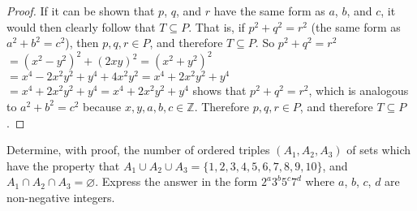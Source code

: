 \documentclass[12pt]{article}
\newenvironment{problem}[2][Problem]{\begin{trivlist}
\item[\hskip \labelsep {\bfseries #1}\hskip \labelsep {\bfseries #2.}]}{\end{trivlist}}
\begin{document}
\begin{proof}
If it can be shown that $p$, $q$, and $r$ have the same form as $a$, $b$, and $c$, it would then clearly follow that $T \subseteq P$. That is, if $p^2 + q^2 = r^2$ (the same form as $a^2 + b^2 = c^2$), then $p,q,r\in P$, and therefore $T \subseteq P$. So
\newline 
$p^2 + q^2 = r^2$
\newline
$= (x^2-y^2)^2 + (2xy)^2 = (x^2+y^2)^2$
\newline
$= x^4 -2x^2y^2 + y^4 + 4x^2y^2= x^4 +2x^2y^2 + y^4$
\newline
$= x^4 + 2x^2y^2 + y^4 = x^4 +2x^2y^2 + y^4$
\newline
shows that $p^2 + q^2 = r^2$, which is analogous to $a^2 + b^2 = c^2$ because $x,y,a,b,c \in\mathbb{Z}$. Therefore $p,q,r\in P$, and therefore $T \subseteq P$.
\end{proof}

\begin{problem}[Set Theory Exercise]{9}
Determine, with proof, the number of ordered triples $(A_1,A_2,A_3)$ of sets which have the property that 
$A_1 \cup A_2 \cup A_3 = \{1,2,3,4,5,6,7,8,9,10\}$, and \newline
$A_1 \cap A_2 \cap A_3 = \varnothing$. Express the answer in the form $2^a3^b5^c7^d$ where $a$, $b$, $c$, $d$ are non-negative integers.
\end{problem}
\end{document}
